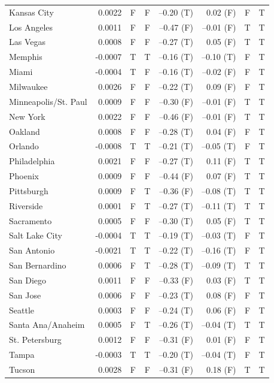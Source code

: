\documentclass[
  12pt,
]{interact}
\begin{document}
\begin{table}
{{\begin{tabular}{lrccrrcc}
\addlinespace
Kansas City & 0.0022 & F & F & --0.20 (T) & 0.02 (F) & F & T\\
Los Angeles & 0.0011 & F & F & --0.47 (F) & --0.01 (F) & T & T\\
Las Vegas & 0.0008 & F & F & --0.27 (T) & 0.05 (F) & T & T\\
Memphis & -0.0007 & T & T & --0.16 (T) & --0.10 (T) & F & T\\
Miami & -0.0004 & T & F & --0.16 (T) & --0.02 (F) & F & T\\
\addlinespace
Milwaukee & 0.0026 & F & F & --0.22 (T) & 0.09 (F) & F & T\\
Minneapolis/St. Paul & 0.0009 & F & F & --0.30 (F) & --0.01 (F) & T & T\\
New York & 0.0022 & F & F & --0.46 (F) & --0.01 (F) & T & T\\
Oakland & 0.0008 & F & F & --0.28 (T) & 0.04 (F) & F & T\\
Orlando & -0.0008 & T & T & --0.21 (T) & --0.05 (T) & F & T\\
\addlinespace
Philadelphia & 0.0021 & F & F & --0.27 (T) & 0.11 (F) & T & T\\
Phoenix & 0.0009 & F & F & --0.44 (F) & 0.07 (F) & T & T\\
Pittsburgh & 0.0009 & F & T & --0.36 (F) & --0.08 (T) & T & T\\
Riverside & 0.0001 & F & T & --0.27 (T) & --0.11 (T) & T & T\\
Sacramento & 0.0005 & F & F & --0.30 (T) & 0.05 (F) & T & T\\
\addlinespace
Salt Lake City & -0.0004 & T & T & --0.19 (T) & --0.03 (T) & F & T\\
San Antonio & -0.0021 & T & T & --0.22 (T) & --0.16 (T) & F & T\\
San Bernardino & 0.0006 & F & T & --0.28 (T) & --0.09 (T) & T & T\\
San Diego & 0.0011 & F & F & --0.33 (F) & 0.03 (F) & T & T\\
San Jose & 0.0006 & F & F & --0.23 (T) & 0.08 (F) & F & T\\
\addlinespace
Seattle & 0.0003 & F & F & --0.24 (T) & 0.06 (F) & F & T\\
Santa Ana/Anaheim & 0.0005 & F & T & --0.26 (T) & --0.04 (T) & T & T\\
St. Petersburg & 0.0012 & F & F & --0.31 (F) & 0.01 (F) & F & T\\
Tampa & -0.0003 & T & T & --0.20 (T) & --0.04 (T) & F & T\\
Tucson & 0.0028 & F & F & --0.31 (F) & 0.18 (F) & T & T\\
\bottomrule
\end{tabular}}

}

\end{table}%
\end{document}
